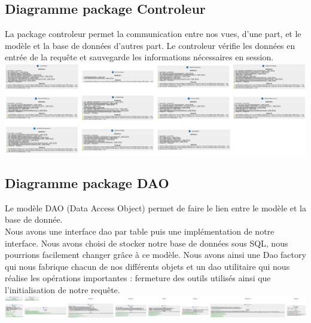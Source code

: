         \subsection{Diagramme package Controleur}
        La package controleur permet la communication entre nos vues, d'une part, et le modèle et la base de données d'autres part. Le controleur vérifie les données en entrée de la requête et sauvegarde les informations nécessaires en session. \\
            \includegraphics[scale=0.2]{ressources/images/ClassesControleur.png}
        \subsection{Diagramme package DAO}
            Le modèle DAO (Data Access Object) permet de faire le lien entre le modèle et la base de donnée. \\
            Nous avons une interface dao par table puis une implémentation de notre interface. Nous avons choisi de stocker notre base de données sous SQL, nous pourrions facilement changer grâce à ce modèle. Nous avons ainsi une Dao factory qui nous fabrique chacun de nos différents objets et un dao utilitaire qui nous réalise les opérations importantes : fermeture des outils utilisés ainsi que l'initialisation de notre requête. \\
            \includegraphics[scale=0.2]{ressources/images/Classesdao.png}
